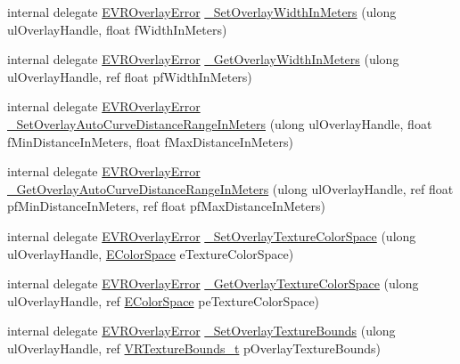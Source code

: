 \begin{DoxyCompactItemize}
\item 
internal delegate \mbox{\hyperlink{namespace_valve_1_1_v_r_aaee5c5144f42b7969d45b854f51b0c18}{E\+V\+R\+Overlay\+Error}} \mbox{\hyperlink{struct_valve_1_1_v_r_1_1_i_v_r_overlay_ae65d9b762f6024173ed7f2362e7755ce}{\+\_\+\+Set\+Overlay\+Width\+In\+Meters}} (ulong ul\+Overlay\+Handle, float f\+Width\+In\+Meters)
\item 
internal delegate \mbox{\hyperlink{namespace_valve_1_1_v_r_aaee5c5144f42b7969d45b854f51b0c18}{E\+V\+R\+Overlay\+Error}} \mbox{\hyperlink{struct_valve_1_1_v_r_1_1_i_v_r_overlay_a428a94d317b358800d0bb78217345815}{\+\_\+\+Get\+Overlay\+Width\+In\+Meters}} (ulong ul\+Overlay\+Handle, ref float pf\+Width\+In\+Meters)
\item 
internal delegate \mbox{\hyperlink{namespace_valve_1_1_v_r_aaee5c5144f42b7969d45b854f51b0c18}{E\+V\+R\+Overlay\+Error}} \mbox{\hyperlink{struct_valve_1_1_v_r_1_1_i_v_r_overlay_a14c24c561079ac045d2e9fd58b896add}{\+\_\+\+Set\+Overlay\+Auto\+Curve\+Distance\+Range\+In\+Meters}} (ulong ul\+Overlay\+Handle, float f\+Min\+Distance\+In\+Meters, float f\+Max\+Distance\+In\+Meters)
\item 
internal delegate \mbox{\hyperlink{namespace_valve_1_1_v_r_aaee5c5144f42b7969d45b854f51b0c18}{E\+V\+R\+Overlay\+Error}} \mbox{\hyperlink{struct_valve_1_1_v_r_1_1_i_v_r_overlay_aea87edea8fd7762358e5a3d3dfd94345}{\+\_\+\+Get\+Overlay\+Auto\+Curve\+Distance\+Range\+In\+Meters}} (ulong ul\+Overlay\+Handle, ref float pf\+Min\+Distance\+In\+Meters, ref float pf\+Max\+Distance\+In\+Meters)
\item 
internal delegate \mbox{\hyperlink{namespace_valve_1_1_v_r_aaee5c5144f42b7969d45b854f51b0c18}{E\+V\+R\+Overlay\+Error}} \mbox{\hyperlink{struct_valve_1_1_v_r_1_1_i_v_r_overlay_adedd3e23f701f36634b7d6a228ec03e2}{\+\_\+\+Set\+Overlay\+Texture\+Color\+Space}} (ulong ul\+Overlay\+Handle, \mbox{\hyperlink{namespace_valve_1_1_v_r_aeb0fba37ba28d8ca276d7c10f01809ac}{E\+Color\+Space}} e\+Texture\+Color\+Space)
\item 
internal delegate \mbox{\hyperlink{namespace_valve_1_1_v_r_aaee5c5144f42b7969d45b854f51b0c18}{E\+V\+R\+Overlay\+Error}} \mbox{\hyperlink{struct_valve_1_1_v_r_1_1_i_v_r_overlay_a1622c8b6098d1b37a9a8f2a1b961f1cf}{\+\_\+\+Get\+Overlay\+Texture\+Color\+Space}} (ulong ul\+Overlay\+Handle, ref \mbox{\hyperlink{namespace_valve_1_1_v_r_aeb0fba37ba28d8ca276d7c10f01809ac}{E\+Color\+Space}} pe\+Texture\+Color\+Space)
\item 
internal delegate \mbox{\hyperlink{namespace_valve_1_1_v_r_aaee5c5144f42b7969d45b854f51b0c18}{E\+V\+R\+Overlay\+Error}} \mbox{\hyperlink{struct_valve_1_1_v_r_1_1_i_v_r_overlay_a08630b9ab7638afe9502371ca7440300}{\+\_\+\+Set\+Overlay\+Texture\+Bounds}} (ulong ul\+Overlay\+Handle, ref \mbox{\hyperlink{struct_valve_1_1_v_r_1_1_v_r_texture_bounds__t}{V\+R\+Texture\+Bounds\+\_\+t}} p\+Overlay\+Texture\+Bounds)

\end{DoxyCompactItemize}
